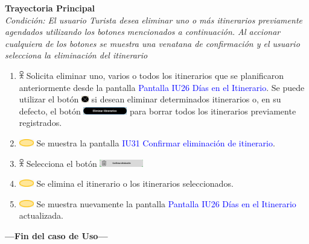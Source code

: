 \textbf{Trayectoria Principal}\\
\textit{Condición: El usuario Turista desea eliminar uno o más itinerarios previamente agendados utilizando los botones mencionados a continuación. Al accionar cualquiera de los botones se muestra una venatana de confirmación y el usuario selecciona la eliminación del itinerario}
\begin{enumerate}
    \item \includegraphics[width=0.0150\textwidth]{Figuras/persona.png} Solicita eliminar uno, varios o todos los itinerarios que se planificaron anteriormente desde la pantalla {\textcolor{blue}{Pantalla IU26 Días en el Itinerario}}. Se puede utilizar el botón \includegraphics[width=0.0250\textwidth]{ComponentesCU/Eliminar.PNG} si desean eliminar determinados itinerarios o, en su defecto, el botón \includegraphics[width=0.150\textwidth]{ComponentesCU/EliminarItinerarios.PNG} para borrar todos los itinerarios previamente registrados.
    \item \includegraphics[width=0.0500\textwidth]{Figuras/sistema.png} Se muestra la pantalla {\textcolor{blue}{IU31 Confirmar eliminación de itinerario}}.
    \item \includegraphics[width=0.0150\textwidth]{Figuras/persona.png} Selecciona el botón  \includegraphics[width=0.150\textwidth]{ComponentesCU/img2.png}
    \item \includegraphics[width=0.0500\textwidth]{Figuras/sistema.png} Se elimina el itinerario o los itinerarios seleccionados.
    \item \includegraphics[width=0.0500\textwidth]{Figuras/sistema.png} Se muestra nuevamente la pantalla {\textcolor{blue}{Pantalla IU26 Días en el Itinerario}} actualizada.
\end{enumerate}
\textbf{---Fin del caso de Uso---}
\vspace{15pt}

